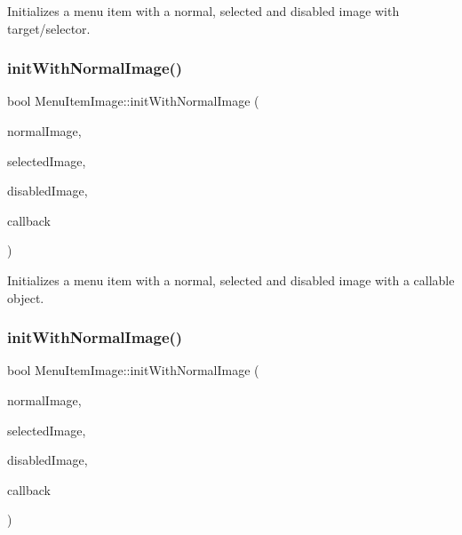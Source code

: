 Initializes a menu item with a normal, selected and disabled image with target/selector. \mbox{\label{classMenuItemImage_af0e4ddc4163e789101bab744c1ba62da}} 
\subsubsection{\texorpdfstring{init\+With\+Normal\+Image()}{initWithNormalImage()}\hspace{0.1cm}{\footnotesize\ttfamily [3/4]}}
{\footnotesize\ttfamily bool Menu\+Item\+Image\+::init\+With\+Normal\+Image (\begin{DoxyParamCaption}\item[{const std\+::string \&}]{normal\+Image,  }\item[{const std\+::string \&}]{selected\+Image,  }\item[{const std\+::string \&}]{disabled\+Image,  }\item[{const cc\+Menu\+Callback \&}]{callback }\end{DoxyParamCaption})}

Initializes a menu item with a normal, selected and disabled image with a callable object. \mbox{\label{classMenuItemImage_af0e4ddc4163e789101bab744c1ba62da}} 
\subsubsection{\texorpdfstring{init\+With\+Normal\+Image()}{initWithNormalImage()}\hspace{0.1cm}{\footnotesize\ttfamily [4/4]}}
{\footnotesize\ttfamily bool Menu\+Item\+Image\+::init\+With\+Normal\+Image (\begin{DoxyParamCaption}\item[{const std\+::string \&}]{normal\+Image,  }\item[{const std\+::string \&}]{selected\+Image,  }\item[{const std\+::string \&}]{disabled\+Image,  }\item[{const cc\+Menu\+Callback \&}]{callback }\end{DoxyParamCaption})}

